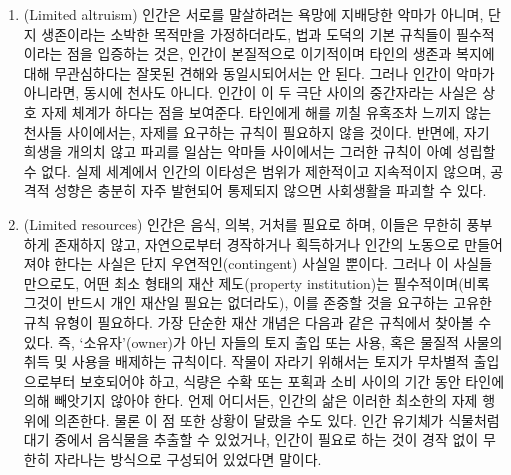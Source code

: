 \begin{enumerate}
  있었을 것이다. 인간이 대략적으로 평등한 대신, 어떤 사람들은 현존 평균
  수준보다 훨씬 강하거나, 휴식을 거의 취하지 않아도 되는 존재일 수도
  있었고, 또는 대부분의 사람들이 평균보다 훨씬 열등했을 수도 있다.
  이러한 예외적 존재들에게는, 타인과 상호 자제하거나 타협하는 것보다
  공격을 통해 더 많은 것을 얻을 가능성이 컸을 것이다. 그러나 우리는
  거인들이 소인들 사이에서 사는 환상적인 장면을 상상할 필요도 없다.
  왜냐하면 의 결정적 중요성은 국제 사회의
  사실들---국가 간의 힘과 취약성의 극단적 불균형---에서 오히려 더 잘
  드러나기 때문이다. 후술하겠지만, 국제법(international law)의 구성
  단위들 사이의 이러한 불평등은, 그것이 국내법(municipal law)과 매우
  다른 성격을 갖게 만든 요인 중 하나이며, 국제법이 조직화된 강제
  체계(coercive system)로 기능할 수 있는 범위를 제한해왔다.
  \textbf{(p.~196)}
\item
   (Limited altruism) 인간은 서로를 말살하려는
  욕망에 지배당한 악마가 아니며, 단지 생존이라는 소박한 목적만을
  가정하더라도, 법과 도덕의 기본 규칙들이 필수적이라는 점을 입증하는
  것은, 인간이 본질적으로 이기적이며 타인의 생존과 복지에 대해
  무관심하다는 잘못된 견해와 동일시되어서는 안 된다. 그러나 인간이
  악마가 아니라면, 동시에 천사도 아니다. 인간이 이 두 극단 사이의
  중간자라는 사실은 상호 자제 체계가 하다는 점을
  보여준다. 타인에게 해를 끼칠 유혹조차 느끼지 않는 천사들 사이에서는,
  자제를 요구하는 규칙이 필요하지 않을 것이다. 반면에, 자기 희생을
  개의치 않고 파괴를 일삼는 악마들 사이에서는 그러한 규칙이 아예 성립할
  수 없다. 실제 세계에서 인간의 이타성은 범위가 제한적이고 지속적이지
  않으며, 공격적 성향은 충분히 자주 발현되어 통제되지 않으면 사회생활을
  파괴할 수 있다.
\item
   (Limited resources) 인간은 음식, 의복, 거처를
  필요로 하며, 이들은 무한히 풍부하게 존재하지 않고, 자연으로부터
  경작하거나 획득하거나 인간의 노동으로 만들어져야 한다는 사실은 단지
  우연적인(contingent) 사실일 뿐이다. 그러나 이 사실들만으로도, 어떤
  최소 형태의 재산 제도(property institution)는 필수적이며(비록 그것이
  반드시 개인 재산일 필요는 없더라도), 이를 존중할 것을 요구하는 고유한
  규칙 유형이 필요하다. 가장 단순한 재산 개념은 다음과 같은 규칙에서
  찾아볼 수 있다. 즉, `소유자'(owner)가 아닌 자들의 토지 출입 또는 사용,
  혹은 물질적 사물의 취득 및 사용을 배제하는 규칙이다. 작물이 자라기
  위해서는 토지가 무차별적 출입으로부터 보호되어야 하고, 식량은 수확
  또는 포획과 소비 사이의 기간 동안 타인에 의해 빼앗기지 않아야 한다.
  언제 어디서든, 인간의 삶은 이러한 최소한의 자제 행위에 의존한다. 물론
  이 점 또한 상황이 달랐을 수도 있다. 인간 유기체가 식물처럼 대기 중에서
  음식물을 추출할 수 있었거나, 인간이 필요로 하는 것이 경작 없이 무한히
  자라나는 방식으로 구성되어 있었다면 말이다.
\end{enumerate}

